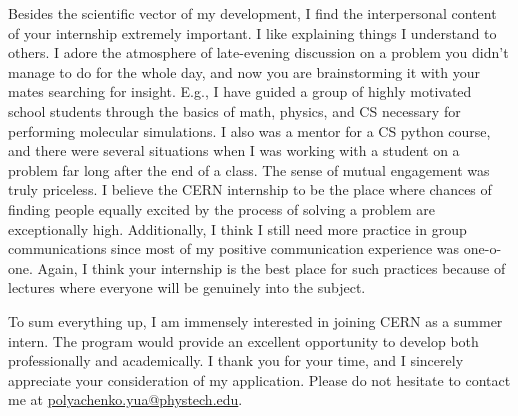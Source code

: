 \documentclass[12pt, a4paper]{awesome-cv}
\begin{document}
\begin{cvletter}
Besides the scientific vector of my development, I find the interpersonal content of your internship extremely important. I like explaining things I understand to others. I adore the atmosphere of late-evening discussion on a problem you didn’t manage to do for the whole day, and now you are brainstorming it with your mates searching for insight. E.g., I have guided a group of highly motivated school students through the basics of math, physics, and CS necessary for performing molecular simulations. I also was a mentor for a CS python course, and there were several situations when I was working with a student on a problem far long after the end of a class. The sense of mutual engagement was truly priceless. I believe the CERN internship to be the place where chances of finding people equally excited by the process of solving a problem are exceptionally high. Additionally, I think I still need more practice in group communications since most of my positive communication experience was one-o-one. Again, I think your internship is the best place for such practices because of lectures where everyone will be genuinely into the subject.


\end{cvletter}



To sum everything up, I am immensely interested in joining CERN as a summer intern. The program would provide an excellent opportunity to develop both professionally and academically. I thank you for your time, and I sincerely appreciate your consideration of my application. Please do not hesitate to contact me at \href{mailto:polyachenko.yua@phystech.edu}{polyachenko.yua@phystech.edu}.

\makeletterclosing
\end{document}
